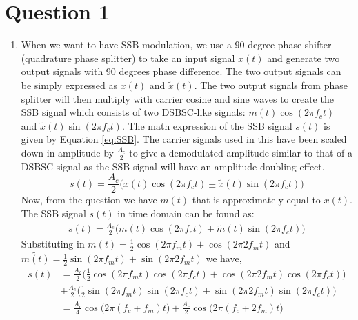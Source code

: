 \documentclass[11pt]{article}
\begin{document}
\section*{Question 1}
\begin{enumerate}[label=(\alph*)]
\item When we want to have SSB modulation, we use a 90 degree phase shifter (quadrature phase splitter) to take an input signal $x(t)$ and generate two output signals with 90 degrees phase difference. The two output signals can be simply expressed as $x(t)$ and $\tilde{x}(t)$. The two output signals from phase splitter will then multiply with carrier cosine and sine waves to create the SSB signal which consists of two DSBSC-like signals: $m(t)\cos(2\pi f_c t)$ and $\tilde{x}(t)\sin(2\pi f_c t)$. The math expression of the SSB signal $s(t)$ is given by Equation \ref{eq:SSB}. The carrier signals used in this have been scaled down in amplitude by $\frac{A_c}{2}$ to give a demodulated amplitude similar to that of a DSBSC signal as the SSB signal will have an amplitude doubling effect. 
\begin{equation}\label{eq:SSB}
    s(t)=\frac{A_c}{2} \biggr (x(t)\cos(2\pi f_c t) \pm \tilde{x}(t)\sin(2\pi f_c t) \biggr)
\end{equation}
Now, from the question we have $m(t)$ that is approximately equal to $x(t)$. The SSB signal $s(t)$ in time domain can be found as:
\begin{align*}
    s(t)=\frac{A_c}{2} \biggr (m(t)\cos(2\pi f_c t) \pm \tilde{m}(t)\sin(2\pi f_c t) \biggr)
\end{align*}
Substituting in $m(t) = \frac{1}{2}\cos(2\pi f_m t)+ \cos(2\pi 2f_m t)$ and $\tilde{m(t)} = \frac{1}{2}\sin(2\pi f_m t)+ \sin(2\pi 2f_m t)$ we have,
\begin{align*}
    s(t) &= \frac{A_c}{2} \biggr( \frac{1}{2}\cos(2\pi f_m t)\cos(2\pi f_c t) + \cos(2\pi 2f_m t) \cos(2\pi f_c t) \biggr)\\
    \hspace{1cm} &\pm \frac{A_c}{2} \biggr( \frac{1}{2}\sin(2\pi f_m t) \sin(2\pi f_c t) + \sin(2\pi 2f_m t) \sin(2\pi f_c t) \biggr)\\
    &= \frac{A_c}{4}\cos \bigg( 2\pi (f_c \mp f_m)t \bigg) + \frac{A_c}{2} \cos \bigg( 2\pi (f_c \mp 2 f_m)t \bigg)
\end{align*}

\end{enumerate}
\end{document}
